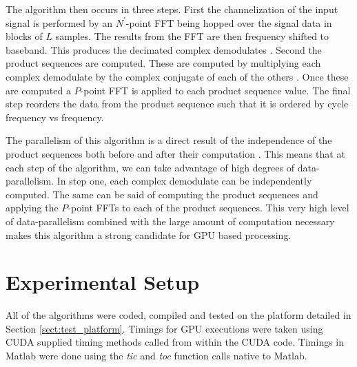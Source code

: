 The algorithm then occurs in three steps.  First the channelization of the input signal is performed by an $N^\prime$-point FFT being hopped over the signal data in blocks of $L$ samples.  The results from the FFT are then frequency shifted to baseband.  This produces the decimated complex demodulates \cite{RobBroLoo91}.  Second the product sequences are computed.  These are computed by multiplying each complex demodulate by the complex conjugate of each of the others \cite{Costa96}.  Once these are computed a $P$-point FFT is applied to each product sequence value.  The final step reorders the data from the product sequence such that it is ordered by cycle frequency vs frequency.

The parallelism of this algorithm is a direct result of the independence of the product sequences both before and after their computation \cite{RobBroLoo91}.  This means that at each step of the algorithm, we can take advantage of high degrees of data-parallelism.  In step one, each complex demodulate can be independently computed.  The same can be said of computing the product sequences and applying the $P$-point FFTs to each of the product sequences.  This very high level of data-parallelism combined with the large amount of computation necessary makes this algorithm a strong candidate for GPU based processing.


\section{Experimental Setup}
\label{sect:gpu_experiment}
All of the algorithms were coded, compiled and tested on the platform detailed in Section \ref{sect:test_platform}.  Timings for GPU executions were taken using CUDA supplied timing methods called from within the CUDA code.  Timings in Matlab were done using the \textit{tic} and \textit{toc} function calls native to Matlab.

